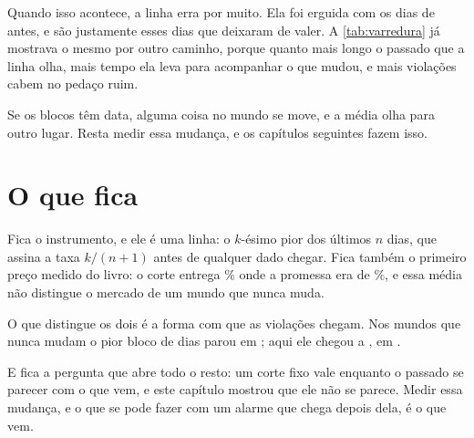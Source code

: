 Quando isso acontece, a linha erra por muito. Ela foi erguida com os dias de antes, e são
justamente esses dias que deixaram de valer. A \cref{tab:varredura} já mostrava o mesmo por
outro caminho, porque quanto mais longo o passado que a linha olha, mais tempo ela leva para
acompanhar o que mudou, e mais violações cabem no pedaço ruim.

Se os blocos têm data, alguma coisa no mundo se move, e a média olha para outro lugar. Resta
medir essa mudança, e os capítulos seguintes fazem isso.

\section{O que fica}

Fica o instrumento, e ele é uma linha: o $k$-ésimo pior dos últimos $n$ dias, que assina a taxa
$k/(n+1)$ antes de qualquer dado chegar. Fica também o primeiro preço medido do livro: o corte
entrega \numCorteContaPct\% onde a promessa era de \numPromessaPct\%, e essa média não distingue
o mercado de um mundo que nunca muda.

O que distingue os dois é a forma com que as violações chegam. Nos mundos que nunca mudam o pior
bloco de \numBlocoDias{} dias parou em \numNuncaMudaPiorBloco; aqui ele chegou a \numBlocoPior, em
\numBlocoPiorData.

E fica a pergunta que abre todo o resto: um corte fixo vale enquanto o passado se parecer com o que
vem, e este capítulo mostrou que ele não se parece. Medir essa mudança, e o que se pode fazer com
um alarme que chega depois dela, é o que vem.
